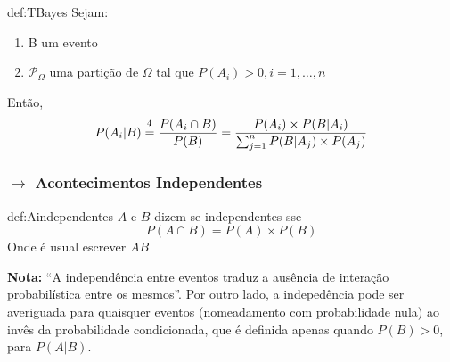 \begin{theo}{def:TBayes}\label{def:TBayes}
    Sejam:

    \vspace{-1em}
    \begin{enumerate}[label=$\bullet$]
        \item B um evento
        \item $\mathcal{P}_\Omega$ uma partição de $\Omega$ tal que $P(A_i) > 0, i = 1,\dots, n$
    \end{enumerate}
    
    \vspace{-1em}
    \noindent Então,
    $$
        P(A_i|B) \equalfootnote \frac{P(A_i \cap B)}{P(B)} = \dfrac{P(A_i) \times P(B|A_i)}{\sum_{j=1}^{n}P(B | A_j) \times P(A_j)}
    $$
\end{theo}


\newpage
\subsubsection[1.2.3 Acontecimentos Independentes]{$\pmb{\rightarrow}$ Acontecimentos Independentes}
\vspace{-0.5 em}
\iffalse
\noindent Dois eventos $A$ e $B$ são independentes caso a realização de um não influencie a concretização do outro. Neste sentido, é possível afirmar que $P(A|B) = P(A)$ e $P(B|A) = P(B)$, o que implica que $P(A \cap B) = P(A) \times P(B)$ (desde que $P(A)\times P(B) > 0$):
\fi
\begin{theo}{def:Aindependentes}\label{def:Aindependentes}
    $A$ e $B$ dizem-se independentes sse
    $$
        P(A \cap B) = P(A) \times P(B)
    $$
    Onde é usual escrever $A$\indep $B$
    
    \vspace{1 em}
    \noindent \textbf{Nota:} ``A independência entre eventos traduz a ausência de interação probabilística entre os mesmos''\cite{Morais2020}. Por outro lado, a indepedência pode ser averiguada para quaisquer eventos (nomeadamento com probabilidade nula) ao invês da probabilidade condicionada, que é definida apenas quando $P(B) > 0$, para $P(A | B)$.
\end{theo}

